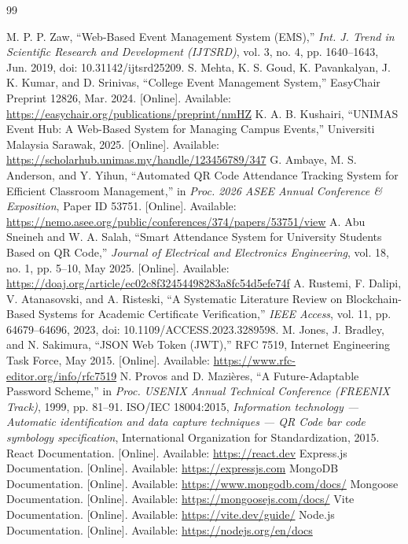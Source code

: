 \documentclass[12pt,a4paper]{report}
\begin{document}
\begin{thebibliography}{99}
\renewcommand{\bibname}{References}
 M. P. P. Zaw, ``Web-Based Event Management System (EMS),'' \emph{Int. J. Trend in Scientific Research and Development (IJTSRD)}, vol. 3, no. 4, pp. 1640--1643, Jun. 2019, doi: 10.31142/ijtsrd25209.
 S. Mehta, K. S. Goud, K. Pavankalyan, J. K. Kumar, and D. Srinivas, ``College Event Management System,'' EasyChair Preprint 12826, Mar. 2024. [Online]. Available: \url{https://easychair.org/publications/preprint/nmHZ}
 K. A. B. Kushairi, ``UNIMAS Event Hub: A Web-Based System for Managing Campus Events,'' Universiti Malaysia Sarawak, 2025. [Online]. Available: \url{https://scholarhub.unimas.my/handle/123456789/347}
 G. Ambaye, M. S. Anderson, and Y. Yihun, ``Automated QR Code Attendance Tracking System for Efficient Classroom Management,'' in \emph{Proc. 2026 ASEE Annual Conference \& Exposition}, Paper ID 53751. [Online]. Available: \url{https://nemo.asee.org/public/conferences/374/papers/53751/view}
 A. Abu Sneineh and W. A. Salah, ``Smart Attendance System for University Students Based on QR Code,'' \emph{Journal of Electrical and Electronics Engineering}, vol. 18, no. 1, pp. 5--10, May 2025. [Online]. Available: \url{https://doaj.org/article/ec02c8f32454498283a8fc54d5efe74f}
 A. Rustemi, F. Dalipi, V. Atanasovski, and A. Risteski, ``A Systematic Literature Review on Blockchain-Based Systems for Academic Certificate Verification,'' \emph{IEEE Access}, vol. 11, pp. 64679--64696, 2023, doi: 10.1109/ACCESS.2023.3289598.
 M. Jones, J. Bradley, and N. Sakimura, ``JSON Web Token (JWT),'' RFC 7519, Internet Engineering Task Force, May 2015. [Online]. Available: \url{https://www.rfc-editor.org/info/rfc7519}
 N. Provos and D. Mazi\`eres, ``A Future-Adaptable Password Scheme,'' in \emph{Proc. USENIX Annual Technical Conference (FREENIX Track)}, 1999, pp. 81--91.
 ISO/IEC 18004:2015, \emph{Information technology --- Automatic identification and data capture techniques --- QR Code bar code symbology specification}, International Organization for Standardization, 2015.
 React Documentation. [Online]. Available: \url{https://react.dev}
 Express.js Documentation. [Online]. Available: \url{https://expressjs.com}
 MongoDB Documentation. [Online]. Available: \url{https://www.mongodb.com/docs/}
 Mongoose Documentation. [Online]. Available: \url{https://mongoosejs.com/docs/}
 Vite Documentation. [Online]. Available: \url{https://vite.dev/guide/}
 Node.js Documentation. [Online]. Available: \url{https://nodejs.org/en/docs}
\end{thebibliography}
\newpage
\end{document}
